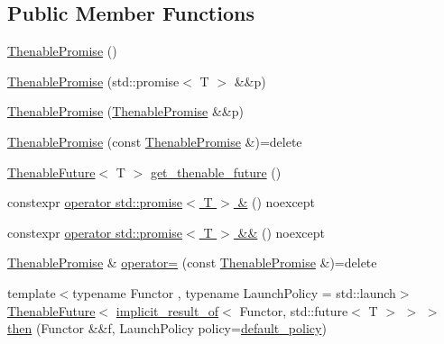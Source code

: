 \subsection*{Public Member Functions}
\begin{DoxyCompactItemize}
\item 
\hyperlink{classthenable_1_1_thenable_promise_a5dcdc4a9487131b5dd96e084fafb6de6}{Thenable\+Promise} ()
\item 
\hyperlink{classthenable_1_1_thenable_promise_ad25a92a963b5fbd064e378779a5c9bfe}{Thenable\+Promise} (std\+::promise$<$ T $>$ \&\&p)
\item 
\hyperlink{classthenable_1_1_thenable_promise_a9d850b76b46dfb04943553fba4d97323}{Thenable\+Promise} (\hyperlink{classthenable_1_1_thenable_promise}{Thenable\+Promise} \&\&p)
\item 
\hyperlink{classthenable_1_1_thenable_promise_aab4dbabc0987e35017c21026bd995559}{Thenable\+Promise} (const \hyperlink{classthenable_1_1_thenable_promise}{Thenable\+Promise} \&)=delete
\item 
\hyperlink{classthenable_1_1_thenable_future}{Thenable\+Future}$<$ T $>$ \hyperlink{classthenable_1_1_thenable_promise_ae65833002d25ebac014ce36fe945aeca}{get\+\_\+thenable\+\_\+future} ()
\item 
constexpr \hyperlink{classthenable_1_1_thenable_promise_a7245d63eb75cb17f38c8c48467129b54}{operator std\+::promise$<$ T $>$ \&} () noexcept
\item 
constexpr \hyperlink{classthenable_1_1_thenable_promise_a78ab6b269bcca9721b1be918a4ba64d6}{operator std\+::promise$<$ T $>$ \&\&} () noexcept
\item 
\hyperlink{classthenable_1_1_thenable_promise}{Thenable\+Promise} \& \hyperlink{classthenable_1_1_thenable_promise_a7a7ab14665d602c6ccae9e7a97a2005e}{operator=} (const \hyperlink{classthenable_1_1_thenable_promise}{Thenable\+Promise} \&)=delete
\item 
{\footnotesize template$<$typename Functor , typename Launch\+Policy  = std\+::launch$>$ }\\\hyperlink{classthenable_1_1_thenable_future}{Thenable\+Future}$<$ \hyperlink{namespacethenable_a1ecf08d6ad8b8688d7b4df047b5feaae}{implicit\+\_\+result\+\_\+of}$<$ Functor, std\+::future$<$ T $>$ $>$ $>$ \hyperlink{classthenable_1_1_thenable_promise_a236d39e15180107acb51173760f98510}{then} (Functor \&\&f, Launch\+Policy policy=\hyperlink{namespacethenable_a55a20a452e9ba9c0eff946d9b8636f06}{default\+\_\+policy})
\end{DoxyCompactItemize}


